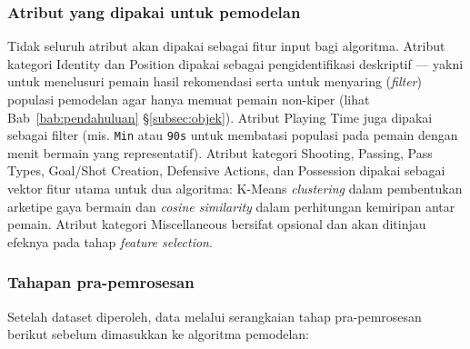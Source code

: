 \subsubsection{Atribut yang dipakai untuk pemodelan}

Tidak seluruh atribut akan dipakai sebagai fitur input bagi algoritma. Atribut kategori Identity dan Position dipakai sebagai pengidentifikasi deskriptif --- yakni untuk menelusuri pemain hasil rekomendasi serta untuk menyaring (\emph{filter}) populasi pemodelan agar hanya memuat pemain non-kiper (lihat Bab~\ref{bab:pendahuluan} \S\ref{subsec:objek}). Atribut Playing Time juga dipakai sebagai filter (mis. \texttt{Min} atau \texttt{90s} untuk membatasi populasi pada pemain dengan menit bermain yang representatif). Atribut kategori Shooting, Passing, Pass Types, Goal/Shot Creation, Defensive Actions, dan Possession dipakai sebagai vektor fitur utama untuk dua algoritma: K-Means \emph{clustering} dalam pembentukan arketipe gaya bermain dan \emph{cosine similarity} dalam perhitungan kemiripan antar pemain. Atribut kategori Miscellaneous bersifat opsional dan akan ditinjau efeknya pada tahap \emph{feature selection}.

\subsubsection{Tahapan pra-pemrosesan}

Setelah dataset diperoleh, data melalui serangkaian tahap pra-pemrosesan berikut sebelum dimasukkan ke algoritma pemodelan:

